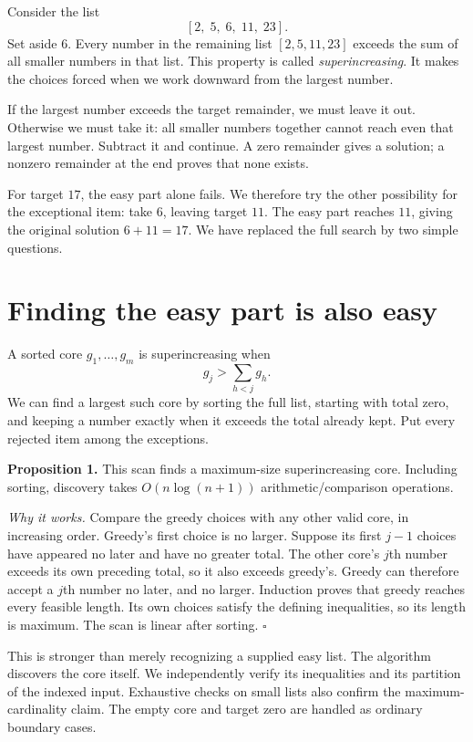 \documentclass[10pt,english]{article}
\begin{document}
Consider the list
\[
[2,\;5,\;6,\;11,\;23].
\]
Set aside \(6\). Every number in the remaining list \([2,5,11,23]\) exceeds the sum of all smaller numbers in that list. This property is called \emph{superincreasing}. It makes the choices forced when we work downward from the largest number.

If the largest number exceeds the target remainder, we must leave it out. Otherwise we must take it: all smaller numbers together cannot reach even that largest number. Subtract it and continue. A zero remainder gives a solution; a nonzero remainder at the end proves that none exists.

For target \(17\), the easy part alone fails. We therefore try the other possibility for the exceptional item: take \(6\), leaving target \(11\). The easy part reaches \(11\), giving the original solution \(6+11=17\). We have replaced the full search by two simple questions.

\section{Finding the easy part is also easy}
A sorted core \(g_1,\ldots,g_m\) is superincreasing when
\[
g_j>\sum_{h<j}g_h.
\]
We can find a largest such core by sorting the full list, starting with total zero, and keeping a number exactly when it exceeds the total already kept. Put every rejected item among the exceptions.

\begin{tcolorbox}[accentbox]
\textbf{Proposition 1.} This scan finds a maximum-size superincreasing core. Including sorting, discovery takes \(O(n\log(n+1))\) arithmetic/comparison operations.
\end{tcolorbox}

\textit{Why it works.} Compare the greedy choices with any other valid core, in increasing order. Greedy's first choice is no larger. Suppose its first \(j-1\) choices have appeared no later and have no greater total. The other core's \(j\)th number exceeds its own preceding total, so it also exceeds greedy's. Greedy can therefore accept a \(j\)th number no later, and no larger. Induction proves that greedy reaches every feasible length. Its own choices satisfy the defining inequalities, so its length is maximum. The scan is linear after sorting. \hfill\(\square\)

This is stronger than merely recognizing a supplied easy list. The algorithm discovers the core itself. We independently verify its inequalities and its partition of the indexed input. Exhaustive checks on small lists also confirm the maximum-cardinality claim. The empty core and target zero are handled as ordinary boundary cases.
\end{document}
